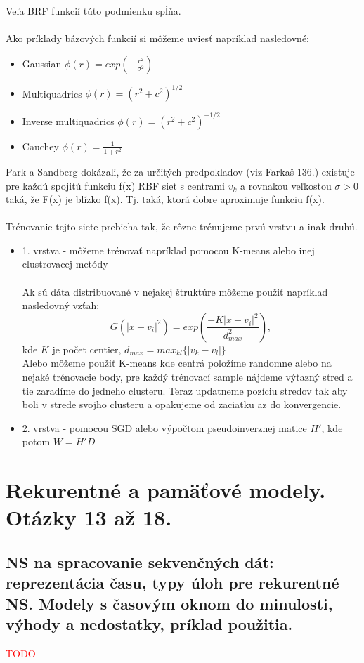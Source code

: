 \documentclass{article}
\numberwithin{equation}{section} %
\begin{document}
Veľa BRF funkcií túto podmienku spĺňa.
\\\\
Ako príklady bázových funkcií si môžeme uviesť napríklad nasledovné:\\
\begin{itemize}
\item Gaussian $\phi(r) = exp(-\frac{r^2}{\sigma^2})$
\item Multiquadrics $\phi(r) = (r^2 + c^2)^{1/2}$
\item Inverse multiquadrics $\phi(r) =  (r^2 + c^2)^{-1/2}$
\item Cauchey $\phi(r) = \frac{1}{1+r^2}$
\end{itemize}
Park a Sandberg dokázali, že za určitých predpokladov (viz Farkaš 136.) existuje pre každú spojitú funkciu f(x) RBF sieť s centrami $v_k$ a rovnakou veľkosťou $\sigma > 0$ taká, že F(x) je blízko f(x). Tj. taká, ktorá dobre aproximuje funkciu f(x).
\\\\
Trénovanie tejto siete prebieha tak, že rôzne trénujeme prvú vrstvu a inak druhú.
\begin{itemize}
\item 1. vrstva - môžeme trénovať napríklad pomocou K-means alebo inej clustrovacej metódy \\\\
Ak sú dáta distribuované v nejakej štruktúre môžeme použiť napríklad nasledovný vzťah:
$$ G(|x-v_i|^2) = exp(\frac{-K|x-v_i|^2}{d^2_{max}}), $$ kde $K$ je počet centier, $d_{max} = max_{kl}\{|v_k - v_l|\}$\\ 
Alebo môžeme použiť K-means kde centrá položíme randomne alebo na nejaké trénovacie body, pre každý trénovací sample nájdeme výťazný stred a tie zaradíme do jedneho clusteru. Teraz updatneme pozíciu stredov tak aby boli v strede svojho clusteru a opakujeme od zaciatku az do konvergencie.
\item 2. vrstva - pomocou SGD alebo výpočtom pseudoinverznej matice $H'$, kde potom $W = H'D$
\end{itemize}



\section{Rekurentné a pamäťové modely. Otázky 13 až 18.}	
\subsection{NS na spracovanie sekvenčných dát: reprezentácia času, typy úloh pre rekurentné NS. Modely s časovým oknom do minulosti, výhody a nedostatky, príklad použitia.}
\textcolor{red}{TODO}
\end{document}
